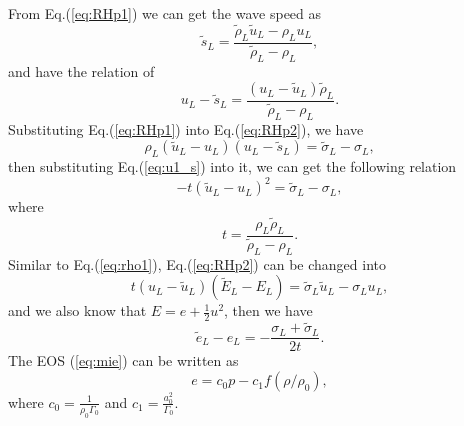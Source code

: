 \documentclass{article}
\numberwithin{equation}{section}
\numberwithin{table}{section}
\begin{document}
 From Eq.(\ref{eq:RHp1}) we can get the wave speed as
  \begin{equation}
	\widetilde{s}_L = \frac{\widetilde{\rho}_L \widetilde{u}_L-\rho_Lu_L}{\widetilde{\rho}_L-\rho_L},
  \end{equation}
and  have the relation of
\begin{equation}\label{eq:u1_s}
  u_L-\widetilde{s}_L = \frac{(u_L-\widetilde{u}_L)\widetilde{\rho}_L}{\widetilde{\rho}_L-\rho_L}.
\end{equation}
Substituting Eq.(\ref{eq:RHp1}) into Eq.(\ref{eq:RHp2}), we have
\begin{equation}\label{eq:rho1}
  \rho_L(\widetilde{u}_L - u_L)(u_L-\widetilde{s}_L) = \widetilde{\sigma}_L -\sigma_L,
\end{equation}
then substituting Eq.(\ref{eq:u1_s}) into it, we can get the following relation
\begin{equation}\label{eq:tu_2}
  -t(\widetilde{u}_L-u_L)^2 = \widetilde{\sigma}_L-\sigma_L,
\end{equation}
where
\begin{equation}
t=\frac{\rho_L \widetilde{\rho}_L}{\widetilde{\rho}_L-\rho_L}.
\end{equation}
Similar to Eq.(\ref{eq:rho1}), Eq.(\ref{eq:RHp2}) can be changed into
\begin{equation}
  t(u_L-\widetilde{u}_L)(\widetilde{E}_L-E_L) =\widetilde{\sigma}_L\widetilde{u}_L-\sigma_Lu_L,
\end{equation}
and we also know that $E = e+\frac{1}{2}u^2$, then we have
\begin{equation}\label{eq:e21}
  \widetilde{e}_L-e_L= -\frac{\sigma_L+\widetilde{\sigma}_L}{2t}.
\end{equation}
The EOS (\ref{eq:mie}) can be written as
\begin{equation} \label{eq:eos1}
  e=c_0 p-c_1f(\rho/\rho_0),
\end{equation}
where $c_0=\frac{1}{\rho_0\Gamma_0}$ and $c_1=\frac{a_0^2}{\Gamma_0}$.
\end{document}
